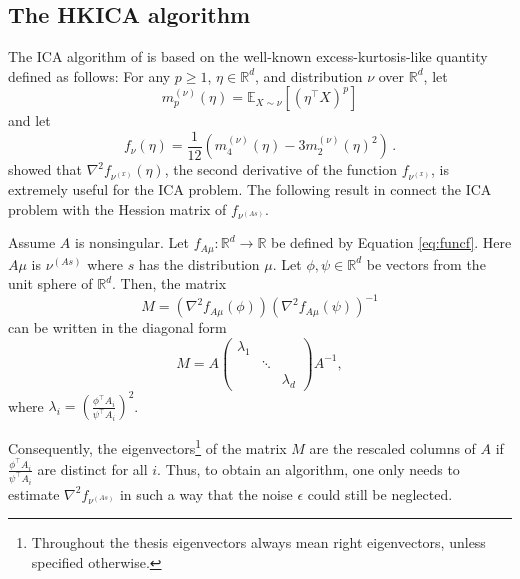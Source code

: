 \documentclass[11pt]{article}
\newcommand{\E}{\mathbb{E}}
\newcommand{\ra}{\rightarrow}
\newcommand{\real}{\mathbb{R}}
\begin{document}
\subsection{The HKICA algorithm}
\label{subsec:HKICA}
The ICA algorithm of \citet{hsu2013learning} is based on the well-known excess-kurtosis-like quantity
defined as follows:
For any $p\ge 1$, $\eta\in \real^d$, and distribution $\nu$ over $\real^d$,
let 
\begin{equation}
\label{eq:momnent}
m_p^{(\nu)}(\eta) = \E_{X\sim \nu}[ (\eta^\top X)^p ]
\end{equation}
and let
\begin{equation}
\label{eq:funcf}
f_{\nu}(\eta) = \frac1{12} \left( m_4^{(\nu)}(\eta) - 3 m_2^{(\nu)}(\eta)^2 \right)\,.
\end{equation}
\citet{hsu2013learning} showed that $\nabla^2f_{\nu^{(x)}}(\eta)$, the second derivative of the function $f_{\nu^{(x)}}$, is extremely useful for the ICA problem. 
The following result in \citep{hsu2013learning} connect the ICA problem with the Hession matrix of $f_{\nu^{(As)}}$.
\begin{thm}
	\label{thm:hsu}
	Assume $A$ is nonsingular. 
	Let $f_{A\mu}: \real^d \ra \real$ be defined by Equation \eqref{eq:funcf}. Here $A\mu$ is $\nu^{(As)}$ where $s$ has the distribution $\mu$.
	Let $\phi,\psi\in \real^d$ be vectors from the unit sphere of $\real^d$. Then, 
	the matrix
	\begin{equation}
	\label{eq:M}
	M =(\nabla^2f_{A\mu}(\phi))(\nabla^2f_{A\mu}(\psi))^{-1} 
	\end{equation}
	can be written in the diagonal form
	\begin{equation}
	\label{eq:M2}
	M = A 
	\left(
	\begin{array}{ccc}
	\lambda_1 & & \\ %
	& \ddots & \\
	& & \lambda_d %
	\end{array} 
	\right) 
	A^{-1},
	\end{equation}
	where $\lambda_i = \left(\frac{\phi^{\top}A_i}{\psi^{\top}A_i}\right)^2$.
\end{thm}
Consequently, the eigenvectors\footnote{Throughout the thesis eigenvectors always mean right eigenvectors, unless specified otherwise.} of the matrix $M$ are the rescaled columns of $A$ if $\frac{\phi^\top A_i}{\psi^\top A_i}$ are distinct for all $i$. 
Thus, to obtain an algorithm, one only needs to estimate $\nabla^2 f_{\nu^{(As)}}$ in such a way that the noise $\epsilon$ could still be neglected.
\end{document}
